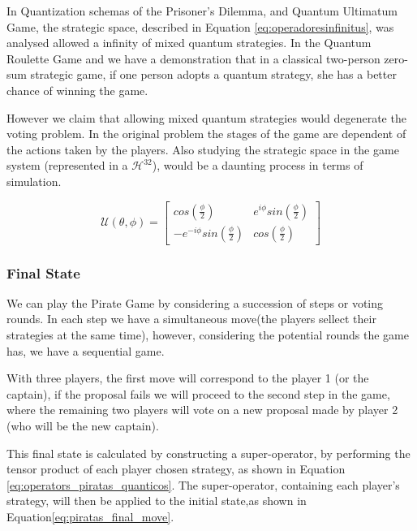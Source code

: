 In Quantization schemas of the Prisoner's Dilemma\cite{Letters2002}\cite{Eisert2008}, and Quantum Ultimatum Game\cite{Fra2011}, the strategic space, described in Equation \ref{eq:operadoresinfinitus}, was analysed allowed a infinity of mixed quantum strategies. In the Quantum Roulette Game\cite{Salimi2009} and \cite{Meyer1999} we have a demonstration that in a classical two-person zero-sum strategic game, if one person adopts a quantum strategy, she has a better chance of winning the game. 

However we claim that allowing mixed quantum strategies would degenerate the voting problem. In the original problem the stages of the game are dependent of the actions taken by the players. Also studying the strategic space in the game system (represented in a $\mathcal{H}^{32}$), would be a daunting process in terms of simulation. 

\begin{equation}
\mathcal{U}(\theta,\phi) = \left[\begin{array}{cc}
cos(\frac{\phi}{2}) & e^{i\phi}sin(\frac{\phi}{2})\\
-e^{-i\phi}sin(\frac{\phi}{2}) & cos(\frac{\phi}{2})
\end{array}\right]
\label{eq:operadoresinfinitus}
\end{equation}

\subsubsection{Final State}
\label{subsec:pirates_finalstate}

We can play the Pirate Game by considering a succession of steps or voting rounds. In each step we have a simultaneous move(the players sellect their strategies at the same time), however, considering the potential rounds the game has, we have a sequential game. 

With three players, the first move will correspond to the player 1 (or the captain), if the proposal fails we will proceed to the second step in the game, where the remaining two players will vote on a new proposal made by player 2 (who will be the new captain). 

This final state is calculated by constructing a super-operator, by performing the tensor product of each player chosen strategy, as shown in Equation \ref{eq:operators_piratas_quanticos}. The super-operator, containing each player's strategy, will then be applied to the initial state,as shown in Equation\ref{eq:piratas_final_move}.

